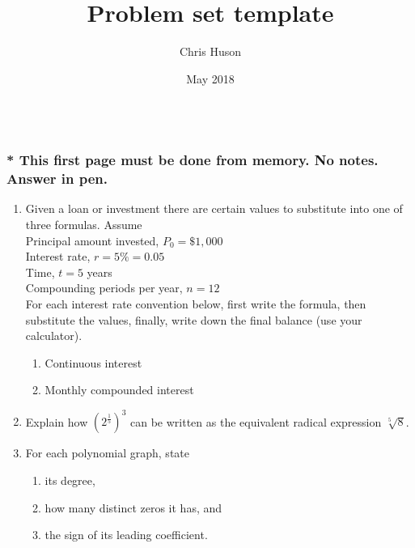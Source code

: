 \documentclass[12pt, oneside]{article}
\title{Problem set template}
\author{Chris Huson}
\date{May 2018}
\begin{document}

\subsubsection*{\\* \textnormal{This first page must be done from memory. No notes. Answer in pen.}}

\begin{enumerate}

\item Given a loan or investment there are certain values to substitute into one of three formulas. Assume\\[5pt]
\quad Principal amount invested, $P_0= \$1,000$\\[5pt]
\quad Interest rate, $r=5\% = 0.05$\\[5pt]
\quad Time, $t=5$ years \\[5pt]
\quad Compounding periods per year, $n=12$\\[15pt]
For each interest rate convention below, first write the formula, then substitute the values, finally, write down the final balance (use your calculator). 

\begin{enumerate}
    \item Continuous interest \\[1.25in]
    \item Monthly compounded interest \\[1.5in]
\end{enumerate}

\item Explain how $\displaystyle \left(2^{\frac{1}{5}} \right)^3$ can be written as the equivalent radical expression $\sqrt[5]8$. %


\newpage
\item For each polynomial graph, state 
\begin{enumerate}
\item its degree,
\item how many distinct zeros it has, and
\item the sign of its leading coefficient.
\end{enumerate}


\end{enumerate}
\end{document}
